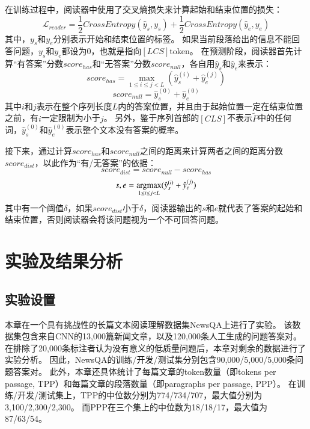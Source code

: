 在训练过程中，阅读器中使用了交叉熵损失来计算起始和结束位置的损失：
\begin{equation}
    \mathcal L_{reader} = \frac{1}{2} CrossEntropy(\hat y_s,y_s) + \frac{1}{2} CrossEntropy(\hat y_e,y_e)
\end{equation}
其中，$y_s$和$y_e$分别表示开始和结束位置的标签。
如果当前段落给出的信息不能回答问题，$y_s$和$y_e$都设为0，也就是指向$[LCS]$token。
在预测阶段，阅读器首先计算“有答案”分数$score_{has}$和“无答案”分数$score_{null}$，各自用$\hat y_s$和$\hat y_e$来表示：
\begin{equation}
    score_{has}=\max \limits_{1\le i\le j<L}(\hat y_{s}^{(i)}+\hat y_{e}^{(j)})
\end{equation}
\begin{equation}
    score_{null}=\hat y_{s}^{(0)}+\hat y_{e}^{(0)}
\end{equation}
其中$i$和$j$表示在整个序列长度$L$内的答案位置，并且由于起始位置一定在结束位置之前，有$i$一定限制为小于$j$。
另外，鉴于序列首部的$[CLS]$不表示$\tilde P$中的任何词，$\hat y^{(0)}_s$和$\hat y^{(0)}_e$表示整个文本没有答案的概率。

接下来，通过计算$score_{has}$和$score_{null}$之间的距离来计算两者之间的距离分数$score_{dist}$，以此作为“有/无答案”的依据：
\begin{equation}
    score_{dist}=score_{null}-score_{has}
\end{equation}
\begin{equation}
    s,e=\operatorname*{argmax} \limits_{1\le i\le j<L}(\hat y_{s}^{(i)}+\hat y_{e}^{(j)})
\end{equation}
其中有一个阈值$\delta$，如果$score_{dist}$小于$\delta$，阅读器输出的$s$和$e$就代表了答案的起始和结束位置，否则阅读器会将该问题视为一个不可回答问题。

\section{实验及结果分析}

\subsection{实验设置}
本章在一个具有挑战性的长篇文本阅读理解数据集NewsQA上进行了实验。
该数据集包含来自CNN的13,000篇新闻文章，以及120,000条人工生成的问题答案对。
在排除了20,000条标注者认为没有意义的低质量问题后，本章对剩余的数据进行了实验分析。
因此，NewsQA的训练/开发/测试集分别包含90,000/5,000/5,000条问题答案对。
此外，本章还具体统计了每篇文章的token数量（即tokens per passage, TPP）和每篇文章的段落数量（即paragraphs per passage, PPP）。
在训练/开发/测试集上，TPP的中位数分别为774/734/707，最大值分别为3,100/2,300/2,300。
而PPP在三个集上的中位数为18/18/17，最大值为87/63/54。

